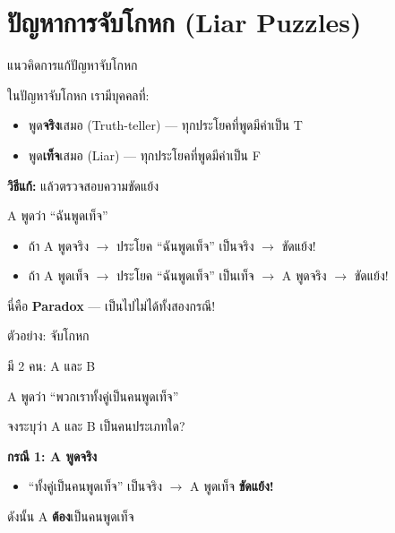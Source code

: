 \documentclass[11pt, aspectratio=169]{beamer}
\begin{document}
\section{ปัญหาการจับโกหก (Liar Puzzles)}

\begin{frame}{แนวคิดการแก้ปัญหาจับโกหก}
  \begin{explanation}[หลักการ]
    ในปัญหาจับโกหก เรามีบุคคลที่:
    \begin{itemize}
      \item พูด\textbf{จริง}เสมอ (Truth-teller) — ทุกประโยคที่พูดมีค่าเป็น T
      \item พูด\textbf{เท็จ}เสมอ (Liar) — ทุกประโยคที่พูดมีค่าเป็น F
    \end{itemize}

    \medskip
    \textbf{วิธีแก้:} 
    แล้วตรวจสอบความขัดแย้ง
  \end{explanation}

  \begin{exambox}
    A พูดว่า ``ฉันพูดเท็จ''

    \medskip
    \begin{itemize}
      \item ถ้า A พูดจริง $\rightarrow$ ประโยค ``ฉันพูดเท็จ'' เป็นจริง $\rightarrow$ ขัดแย้ง!
      \item ถ้า A พูดเท็จ $\rightarrow$ ประโยค ``ฉันพูดเท็จ'' เป็นเท็จ $\rightarrow$ A พูดจริง $\rightarrow$ ขัดแย้ง!
    \end{itemize}

    นี่คือ \textbf{Paradox} — เป็นไปไม่ได้ทั้งสองกรณี!
  \end{exambox}
\end{frame}

\begin{frame}{ตัวอย่าง: จับโกหก}
  \begin{exambox}[โจทย์]
    มี 2 คน: A และ B

    A พูดว่า ``พวกเราทั้งคู่เป็นคนพูดเท็จ''

    จงระบุว่า A และ B เป็นคนประเภทใด?
  \end{exambox}

  \begin{solbox}[วิธีทำ]
    \textbf{กรณี 1: A พูดจริง}
    \begin{itemize}
      \item ``ทั้งคู่เป็นคนพูดเท็จ'' เป็นจริง $\rightarrow$ A พูดเท็จ \textbf{ขัดแย้ง!}
    \end{itemize}
    ดังนั้น A \textbf{ต้อง}เป็นคนพูดเท็จ
  \end{solbox}
\end{frame}
\end{document}
